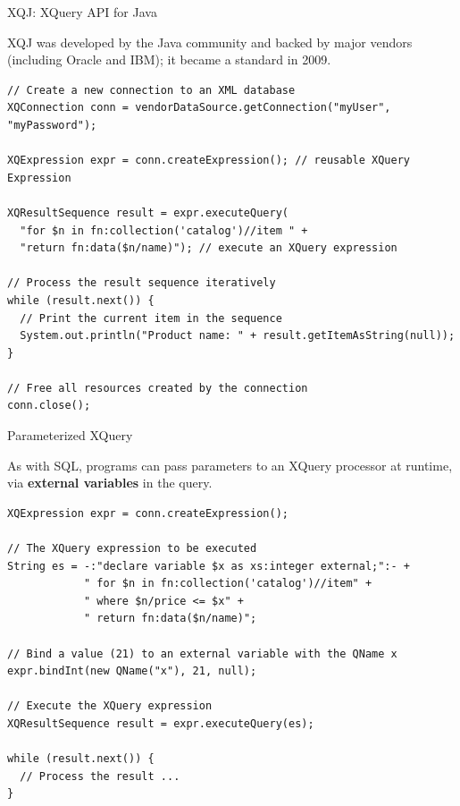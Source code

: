 \begin{frame}[fragile]{XQJ: XQuery API for Java}

XQJ was developed by the Java community and backed by major vendors (including Oracle and IBM); it became a standard in 2009. 

\bgroup
{}

\begin{lstlisting}
// Create a new connection to an XML database
XQConnection conn = vendorDataSource.getConnection("myUser", "myPassword");

XQExpression expr = conn.createExpression(); // reusable XQuery Expression

XQResultSequence result = expr.executeQuery(
  "for $n in fn:collection('catalog')//item " +
  "return fn:data($n/name)"); // execute an XQuery expression

// Process the result sequence iteratively
while (result.next()) {
  // Print the current item in the sequence
  System.out.println("Product name: " + result.getItemAsString(null));
}

// Free all resources created by the connection
conn.close();
\end{lstlisting}
\egroup

\end{frame}

\begin{frame}[fragile]{Parameterized XQuery}

As with SQL, programs can pass parameters to an XQuery processor at runtime, via \textbf{external variables} in the query.

\bgroup
{}

\begin{lstlisting}
XQExpression expr = conn.createExpression();

// The XQuery expression to be executed
String es = -:"declare variable $x as xs:integer external;":- +
            " for $n in fn:collection('catalog')//item" +
            " where $n/price <= $x" +
            " return fn:data($n/name)";

// Bind a value (21) to an external variable with the QName x
expr.bindInt(new QName("x"), 21, null);

// Execute the XQuery expression
XQResultSequence result = expr.executeQuery(es);

while (result.next()) {
  // Process the result ...
}
\end{lstlisting}
\egroup
\end{frame}

